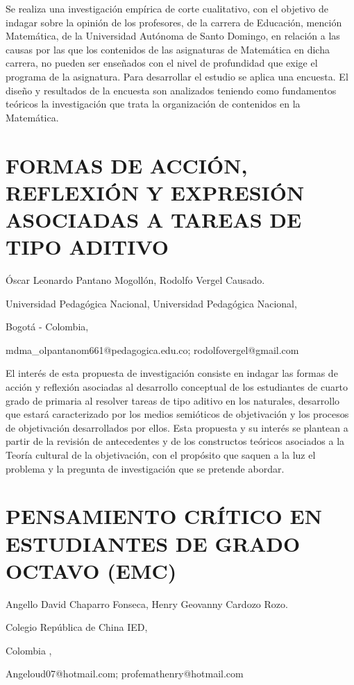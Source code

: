 Se realiza una investigación empírica de corte cualitativo, con el
objetivo de indagar sobre la opinión de los profesores, de la carrera
de Educación, mención Matemática, de la Universidad Autónoma de Santo
Domingo, en relación a las causas por las que los contenidos de las
asignaturas de Matemática en dicha carrera, no pueden ser enseñados
con el nivel de profundidad que exige el programa de la asignatura.
Para desarrollar el estudio se aplica una encuesta. El diseño y resultados
de la encuesta son analizados teniendo como fundamentos teóricos la
investigación que trata la organización de contenidos en la Matemática.


\section{FORMAS DE ACCIÓN, REFLEXIÓN Y EXPRESIÓN ASOCIADAS A TAREAS DE TIPO
ADITIVO}

\begin{datos}

Óscar Leonardo Pantano Mogollón, Rodolfo Vergel Causado.

Universidad Pedagógica Nacional, Universidad Pedagógica Nacional,

Bogotá - Colombia,

mdma\_olpantanom661@pedagogica.edu.co; rodolfovergel@gmail.com

\end{datos}

El interés de esta propuesta de investigación consiste en indagar
las formas de acción y reflexión asociadas al desarrollo conceptual
de los estudiantes de cuarto grado de primaria al resolver tareas
de tipo aditivo en los naturales, desarrollo que estará caracterizado
por los medios semióticos de objetivación y los procesos de objetivación
desarrollados por ellos. Esta propuesta y su interés se plantean a
partir de la revisión de antecedentes y de los constructos teóricos
asociados a la Teoría cultural de la objetivación, con el propósito
que saquen a la luz el problema y la pregunta de investigación que
se pretende abordar.

\setcounter{section}{204}


\section{PENSAMIENTO CRÍTICO EN ESTUDIANTES DE GRADO OCTAVO (EMC)}

\begin{datos}

Angello David Chaparro Fonseca, Henry Geovanny Cardozo Rozo.

Colegio República de China IED,

Colombia ,

Angeloud07@hotmail.com; profemathenry@hotmail.com 

\end{datos}


